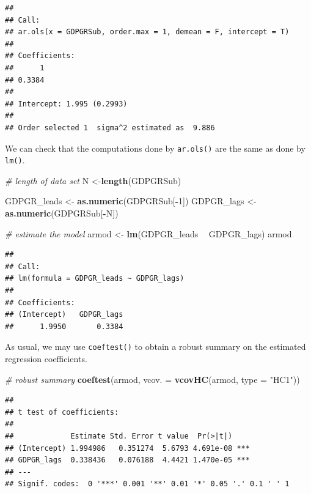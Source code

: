 \documentclass[]{book}
\newenvironment{Shaded}{\begin{snugshade}}{\end{snugshade}}
\newcommand{\KeywordTok}[1]{\textcolor[rgb]{0.13,0.29,0.53}{\textbf{#1}}}
\newcommand{\DataTypeTok}[1]{\textcolor[rgb]{0.13,0.29,0.53}{#1}}
\newcommand{\DecValTok}[1]{\textcolor[rgb]{0.00,0.00,0.81}{#1}}
\newcommand{\StringTok}[1]{\textcolor[rgb]{0.31,0.60,0.02}{#1}}
\newcommand{\CommentTok}[1]{\textcolor[rgb]{0.56,0.35,0.01}{\textit{#1}}}
\newcommand{\OperatorTok}[1]{\textcolor[rgb]{0.81,0.36,0.00}{\textbf{#1}}}
\newcommand{\NormalTok}[1]{#1}
\theoremstyle{definition}
\theoremstyle{definition}
\theoremstyle{definition}
\theoremstyle{remark}
\begin{document}
\begin{verbatim}
## 
## Call:
## ar.ols(x = GDPGRSub, order.max = 1, demean = F, intercept = T)
## 
## Coefficients:
##      1  
## 0.3384  
## 
## Intercept: 1.995 (0.2993) 
## 
## Order selected 1  sigma^2 estimated as  9.886
\end{verbatim}

We can check that the computations done by \texttt{ar.ols()} are the
same as done by \texttt{lm()}.

\begin{Shaded}
\begin{Highlighting}[]
\CommentTok{# length of data set}
\NormalTok{N <-}\KeywordTok{length}\NormalTok{(GDPGRSub)}

\NormalTok{GDPGR_leads <-}\StringTok{ }\KeywordTok{as.numeric}\NormalTok{(GDPGRSub[}\OperatorTok{-}\DecValTok{1}\NormalTok{])}
\NormalTok{GDPGR_lags <-}\StringTok{ }\KeywordTok{as.numeric}\NormalTok{(GDPGRSub[}\OperatorTok{-}\NormalTok{N])}

\CommentTok{# estimate the model}
\NormalTok{armod <-}\StringTok{ }\KeywordTok{lm}\NormalTok{(GDPGR_leads }\OperatorTok{~}\StringTok{ }\NormalTok{GDPGR_lags)}
\NormalTok{armod}
\end{Highlighting}
\end{Shaded}

\begin{verbatim}
## 
## Call:
## lm(formula = GDPGR_leads ~ GDPGR_lags)
## 
## Coefficients:
## (Intercept)   GDPGR_lags  
##      1.9950       0.3384
\end{verbatim}

As usual, we may use \texttt{coeftest()} to obtain a robust summary on
the estimated regression coefficients.

\begin{Shaded}
\begin{Highlighting}[]
\CommentTok{# robust summary}
\KeywordTok{coeftest}\NormalTok{(armod, }\DataTypeTok{vcov. =} \KeywordTok{vcovHC}\NormalTok{(armod, }\DataTypeTok{type =} \StringTok{"HC1"}\NormalTok{))}
\end{Highlighting}
\end{Shaded}

\begin{verbatim}
## 
## t test of coefficients:
## 
##             Estimate Std. Error t value  Pr(>|t|)    
## (Intercept) 1.994986   0.351274  5.6793 4.691e-08 ***
## GDPGR_lags  0.338436   0.076188  4.4421 1.470e-05 ***
## ---
## Signif. codes:  0 '***' 0.001 '**' 0.01 '*' 0.05 '.' 0.1 ' ' 1
\end{verbatim}
\end{document}
